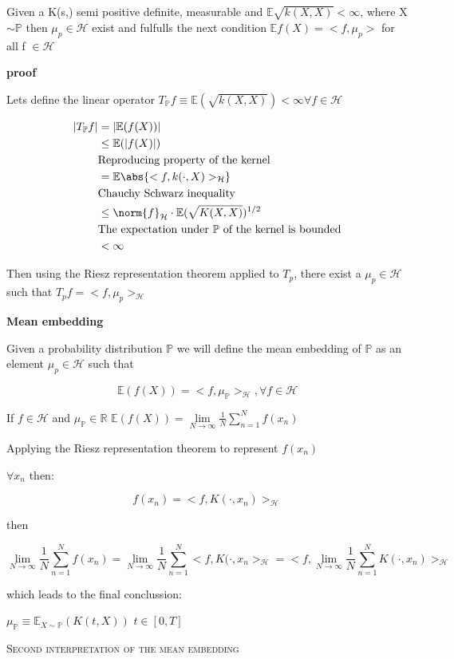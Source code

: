 \begin{lem}
Given a K(s,) semi positive definite, measurable and $\mathbb{E}\sqrt{k(X,X)}<\infty$, where X$\sim \mathbb{P}$ then $\mu_{p} \in \mathcal{H}$ exist and fulfulls the next condition
$\mathbb{E}f(X) = <f,\mu_{p}>$ for all f $\in \mathcal{H}$
\end{lem}
\textbf{proof}

Lets define the linear operator $T_{\mathbb{P}}f\equiv\mathbb{E}(\sqrt{k(X,X)}) < \infty \forall f\in \mathcal{H}$ 
\begin{flushleft}

\begin{equation}{}
\begin{split}
|T_{\mathbb{P}}f| 
&= |\mathbb{E}(f(X))| \\
&\leq \mathbb{E}(|f(X)|)\\
&\text{Reproducing property of the kernel} \\
&=\mathbb{E}\abs{<f,k(\cdot,X)>_{\mathcal{H}}}\\
&\text{Chauchy Schwarz inequality} \\
&\leq \norm{f} _{\mathcal{H}}\cdot\mathbb{E}(\sqrt{K(X,X)})^{1/2}\\
&\text{The expectation under $\mathbb{P}$ of the kernel is bounded} \\
&<\infty 
\end{split}
\end{equation}

\end{flushleft}


Then using the Riesz representation theorem applied to $T_{p}$, there exist a $\mu_{p}\in \mathcal{H}$ such that $T_{p}f = <f,\mu_{p}>_{\mathcal{H}}$


\begin{defn}
\textsf{\textbf{Mean embedding}}

Given a probability distribution $\mathbb{P}$ we will define the mean embedding of $\mathbb{P}$ as an element $\mu_{p} \in \mathcal{H}$ such that

$$\mathbb{E}(f(X))=<f,\mu_{\mathbb{P}}>_{\mathcal{H}}, \forall f \in \mathcal{H}$$

If $f\in \mathcal{H}$ and $\mu_{\mathbb{P}} \in \mathbb{R}$
$\mathbb{E}(f(X)) = \lim\limits_{N \to \infty} \frac{1}{N} \sum\limits_{n=1}^{N}f(x_{n})$

Applying the Riesz representation theorem to represent $f(x_{n})$

$\forall x_{n}$ then:

$$f(x_{n}) = <f,K(\cdot,x_{n})>_{\mathcal{H}}$$


then

$$\lim\limits_{N \to \infty} \frac{1}{N} \sum\limits_{n=1}^{N}f(x_{n}) = \lim\limits_{N \to \infty} \frac{1}{N} \sum\limits_{n=1}^{N} <f,K(\cdot,x_{n}>_{\mathcal{H}} = <f, \lim\limits_{N \to \infty} \frac{1}{N} \sum\limits_{n=1}^{N}K(\cdot,x_{n})>_{\mathcal{H}}$$

which leads to the final conclussion:

$\mu_{\mathbb{P}} \equiv \mathbb{E}_{X\sim \mathbb{P}}(K(t,X))$  $t \in [0,T]$
\end{defn}
\textsc{Second interpretation of the mean embedding}

